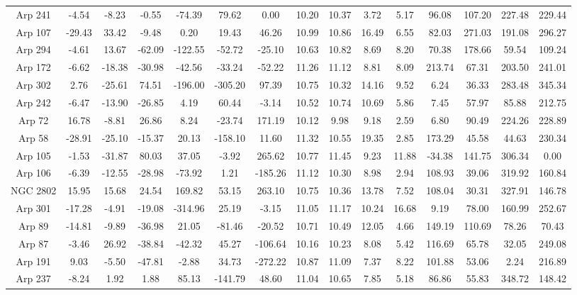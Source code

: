 \begin{table}
{\begin{tabular}{|c|c|c|c|c|c|c|c|c|c|c|c|c|c|c|}
Arp 241 & -4.54 & -8.23 & -0.55 & -74.39 & 79.62 & 0.00 & 10.20 & 10.37 & 3.72 & 5.17 & 96.08 & 107.20 & 227.48 & 229.44 \\
Arp 107 & -29.43 & 33.42 & -9.48 & 0.20 & 19.43 & 46.26 & 10.99 & 10.86 & 16.49 & 6.55 & 82.03 & 271.03 & 191.08 & 296.27 \\
Arp 294 & -4.61 & 13.67 & -62.09 & -122.55 & -52.72 & -25.10 & 10.63 & 10.82 & 8.69 & 8.20 & 70.38 & 178.66 & 59.54 & 109.24 \\
Arp 172 & -6.62 & -18.38 & -30.98 & -42.56 & -33.24 & -52.22 & 11.26 & 11.12 & 8.81 & 8.09 & 213.74 & 67.31 & 203.50 & 241.01 \\
Arp 302 & 2.76 & -25.61 & 74.51 & -196.00 & -305.20 & 97.39 & 10.75 & 10.32 & 14.16 & 9.52 & 6.24 & 36.33 & 283.48 & 345.34 \\
Arp 242 & -6.47 & -13.90 & -26.85 & 4.19 & 60.44 & -3.14 & 10.52 & 10.74 & 10.69 & 5.86 & 7.45 & 57.97 & 85.88 & 212.75 \\
Arp 72 & 16.78 & -8.81 & 26.86 & 8.24 & -23.74 & 171.19 & 10.12 & 9.98 & 9.18 & 2.59 & 6.80 & 90.49 & 224.26 & 228.89 \\
Arp 58 & -28.91 & -25.10 & -15.37 & 20.13 & -158.10 & 11.60 & 11.32 & 10.55 & 19.35 & 2.85 & 173.29 & 45.58 & 44.63 & 230.34 \\
Arp 105 & -1.53 & -31.87 & 80.03 & 37.05 & -3.92 & 265.62 & 10.77 & 11.45 & 9.23 & 11.88 & -34.38 & 141.75 & 306.34 & 0.00 \\
Arp 106 & -6.39 & -12.55 & -28.98 & -73.92 & 1.21 & -185.26 & 11.12 & 10.30 & 8.98 & 2.94 & 108.93 & 39.06 & 319.92 & 160.84 \\
NGC 2802 & 15.95 & 15.68 & 24.54 & 169.82 & 53.15 & 263.10 & 10.75 & 10.36 & 13.78 & 7.52 & 108.04 & 30.31 & 327.91 & 146.78 \\
Arp 301 & -17.28 & -4.91 & -19.08 & -314.96 & 25.19 & -3.15 & 11.05 & 11.17 & 10.24 & 16.68 & 9.19 & 78.00 & 160.99 & 252.67 \\
Arp 89 & -14.81 & -9.89 & -36.98 & 21.05 & -81.46 & -20.52 & 10.71 & 10.49 & 12.05 & 4.66 & 149.19 & 110.69 & 78.26 & 70.43 \\
Arp 87 & -3.46 & 26.92 & -38.84 & -42.32 & 45.27 & -106.64 & 10.16 & 10.23 & 8.08 & 5.42 & 116.69 & 65.78 & 32.05 & 249.08 \\
Arp 191 & 9.03 & -5.50 & -47.81 & -2.88 & 34.73 & -272.22 & 10.87 & 11.09 & 7.37 & 8.22 & 101.88 & 53.06 & 2.24 & 216.89 \\
Arp 237 & -8.24 & 1.92 & 1.88 & 85.13 & -141.79 & 48.60 & 11.04 & 10.65 & 7.85 & 5.18 & 86.86 & 55.83 & 348.72 & 148.42 \\

\end{tabular}}
\end{table}
